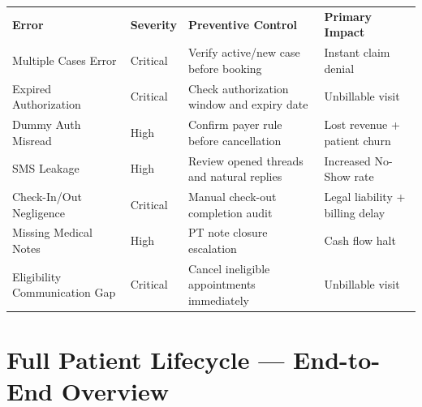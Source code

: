 \documentclass[11pt,a4paper]{article}
\begin{document}
\vspace{0.5em}
\begin{tcolorbox}[infobox,title={Error Risk Summary Matrix}]
\begin{tabularx}{\linewidth}{L{3.5cm} C{1.9cm} L{3.6cm} X}
  \color{white}\textbf{Error} & \color{white}\textbf{Severity} & \color{white}\textbf{Preventive Control} & \color{white}\textbf{Primary Impact} \\
  Multiple Cases Error           & \color{white}Critical & Verify active/new case before booking & Instant claim denial \\
  Expired Authorization          & \color{white}Critical & Check authorization window and expiry date & Unbillable visit \\
  Dummy Auth Misread             & \color{white}High    & Confirm payer rule before cancellation & Lost revenue + patient churn \\
  SMS Leakage                    & \color{white}High    & Review opened threads and natural replies & Increased No-Show rate \\
  Check-In/Out Negligence        & \color{white}Critical & Manual check-out completion audit & Legal liability + billing delay \\
  Missing Medical Notes          & \color{white}High    & PT note closure escalation & Cash flow halt \\
  Eligibility Communication Gap  & \color{white}Critical & Cancel ineligible appointments immediately & Unbillable visit \\
\end{tabularx}
\end{tcolorbox}

\newpage
\section{Full Patient Lifecycle --- End-to-End Overview}
\end{document}
